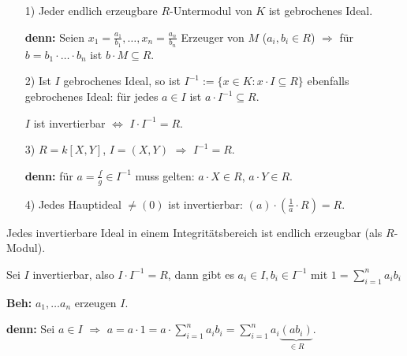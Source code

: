 \begin{nnBsp}
\begin{enumerate}
\item[1)] Jeder endlich erzeugbare $R$-Untermodul von $K$ ist gebrochenes Ideal.

\textbf{denn:} Seien $x_1 = \frac{a_1}{b_1}, \ldots, x_n = \frac{a_n}{b_n}$ Erzeuger von $M$ ($a_i, b_i \in R$) $\Rightarrow$ f\"ur $b = b_1 \cdot \ldots \cdot b_n$ ist $b \cdot M \subseteq R$.

\item[2)] Ist $I$ gebrochenes Ideal, so ist $I^{-1} := \{ x \in K : x \cdot I \subseteq R \}$ ebenfalls gebrochenes Ideal: f\"ur jedes $a \in I$ ist $a \cdot I^{-1} \subseteq R$.

$I$ ist invertierbar $\Leftrightarrow$ $I \cdot I^{-1} = R$.

\item[3)] $R = k[X,Y]$, $I = (X,Y)$ $\Rightarrow$ $I^{-1} = R$.

\textbf{denn:} f\"ur $a = \frac{f}{g} \in I^{-1}$ muss gelten: $a \cdot X \in R$, $a \cdot Y \in R$.

\item[4)] Jedes Hauptideal $\neq (0)$ ist invertierbar: $(a) \cdot (\frac{1}{a} \cdot R) = R$.
\end{enumerate}
\end{nnBsp}

\begin{Bem}\label{2.41}
Jedes invertierbare Ideal in einem Integrit\"atsbereich ist endlich erzeugbar (als $R$-Modul).

\begin{Bew}
Sei $I$ invertierbar, also $I \cdot I^{-1} = R$, dann gibt es $a_i \in I, b_i \in I^{-1}$ mit $1 = \sum_{i=1}^{n} a_i b_i$

\textbf{Beh:} $a_1, \ldots a_n$ erzeugen $I$.

\textbf{denn:} Sei $a \in I$ $\Rightarrow$ $a = a \cdot 1 = a \cdot \sum_{i=1}^{n} a_i b_i = \sum_{i=1}^{n} a_i \underbrace{(a b_i)}_{\in R}$.

\end{Bew}
\end{Bem}

